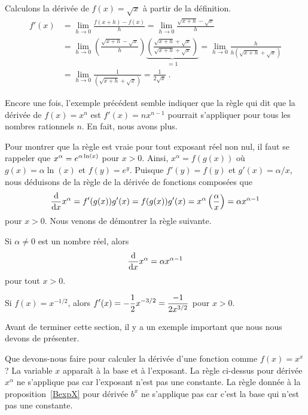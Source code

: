 {\begin{egg}
Calculons la dérivée de $f(x) = \sqrt{x}$ à partir de la définition.
\begin{align*}
f'(x) &= \lim_{h\to 0} \frac{f(x+h)-f(x)}{h}
= \lim_{h\to 0} \frac{\sqrt{x+h}-\sqrt{x}}{h} \\
&= \lim_{h\to 0} \left(\frac{\sqrt{x+h}-\sqrt{x}}{h}\right)
\underbrace{\left(\frac{\sqrt{x+h}+\sqrt{x}}{\sqrt{x+h}+\sqrt{x}}\right)}_{=1}
= \lim_{h\to 0} \frac{h}{h(\sqrt{x+h}+\sqrt{x})} \\
&= \lim_{h\to 0} \frac{1}{(\sqrt{x+h}+\sqrt{x})} = \frac{1}{2\sqrt{x}} \ .
\end{align*}
\end{egg}

Encore une fois, l'exemple précédent semble indiquer que la règle qui
dit que la dérivée de $f(x) = x^n$ est $f'(x) = nx^{n-1}$ pourrait
s'appliquer pour tous les nombres rationnels $n$.  En fait,
nous avons plus.

Pour montrer que la règle est vraie pour tout exposant réel non nul,
il faut se rappeler que $\DS x^\alpha = e^{\alpha \ln(x)}$
pour $x>0$.  Ainsi, $x^\alpha = f(g(x))$ où $g(x) = \alpha \ln(x)$ et
$f(y) = e^y$.   Puisque $f'(y) = f(y)$ et $g'(x) = \alpha / x$,
nous déduisons de la règle de la dérivée de fonctions composées que
\[
\dfdx{x^\alpha}{x} = f'(g(x)) g'(x)
= f(g(x)) g'(x) = x^{\alpha} \left(\frac{\alpha}{x}\right)
= \alpha x^{\alpha-1}
\]
pour $x>0$.  Nous venons de démontrer la règle suivante.

\begin{prop}
Si $\alpha \neq 0$ est un nombre réel, alors
\[
\dfdx{x^\alpha}{x} = \alpha x^{\alpha-1}
\]
pour tout $x>0$.
\end{prop}

\begin{egg}
Si $f(x) = x^{-1/2}$, alors
$\DS f'(x) = -\frac{1}{2} x^{-3/2} = \frac{-1}{2 x^{3/2}}$
pour $x>0$.
\end{egg}

Avant de terminer cette section, il y a un exemple important que nous
nous devons de présenter.

\begin{egg}
Que devons-nous faire pour calculer la dérivée d'une fonction comme
$f(x) = x^x$?  La variable $x$ apparaît à la base et à l'exposant.
La règle ci-dessus pour dérivée $x^\alpha$ ne s'applique pas car
l'exposant n'est pas une constante.  La règle donnée à la
proposition~\ref{BexpX} pour dérivée $b^x$ ne s'applique pas car
c'est la base qui n'est pas une constante.


\end{egg}}
